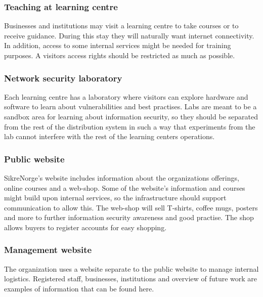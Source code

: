 \subsubsection{Teaching at learning centre}

Businesses and institutions may visit a learning centre to take courses or to receive guidance. During this stay they will naturally want internet connectivity. In addition, access to some internal services might be needed for training purposes. A visitors access rights should be restricted as much as possible.

\subsubsection{Network security laboratory}

Each learning centre has a laboratory where visitors can explore hardware and software to learn about vulnerabilities and best practises. Labs are meant to be a sandbox area for learning about information security, so they should be separated from the rest of the distribution system in such a way that experiments from the lab cannot interfere with the rest of the learning centers operations.


\subsubsection{Public website}

SikreNorge's website includes information about the organizations offerings, online courses and a web-shop. Some of the website's information and courses might build upon internal services, so the infrastructure should support communication to allow this. The web-shop will sell T-shirts, coffee mugs, posters and more to further information security awareness and good practise. The shop allows buyers to register accounts for easy shopping.

\subsubsection{Management website}

The organization uses a website separate to the public website to manage internal logistics. Registered staff, businesses, institutions and overview of future work are examples of information that can be found here.

